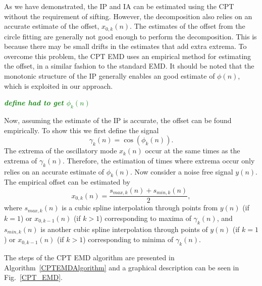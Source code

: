 \documentclass[a4paper]{IEEEtran}
\newcommand{\dean}[1]{\textsf{\emph{\textbf{\textcolor{green}{#1}}}}}
\begin{document}
As we have demonstrated, the IP and IA can be estimated using the CPT without the requirement of sifting. However, the decomposition also relies on an accurate estimate of the offset, $x_{0,k}(n)$. The estimates of the offset from the circle fitting are generally not good enough to perform the decomposition. This is because there may be small drifts in the estimates that add extra extrema. To overcome this problem, the CPT EMD uses an empirical method for estimating the offset, in a similar fashion to the standard EMD. It should be noted that the monotonic structure of the IP generally enables an good estimate of $\phi(n)$, which is exploited in our approach. 

\dean{define had to get $\phi_k(n)$}

Now, assuming the estimate of the IP is accurate, the offset can be found empirically. To show this we first define the signal
\begin{equation}
	\gamma_k(n)=\cos(\phi_k(n)).
\end{equation}   
The extrema of the oscillatory mode $x_k(n)$ occur at the same times as the extrema of $\gamma_k(n)$. Therefore, the estimation of times where extrema occur only relies on an accurate estimate of $\phi_k(n)$. Now consider a noise free signal $y(n)$. The empirical offset can be estimated by 
\begin{equation}
    x_{0,k}(n) = \frac{s_{max,k}(n) + s_{min,k}(n)}{2},
\end{equation}
where $s_{max,k}(n)$ is a cubic spline interpolation through points from $y(n)$ (if $k=1$) or $x_{0,k-1}(n)$ (if $k>1$) corresponding to maxima of $\gamma_k(n)$, and $s_{min,k}(n)$ is another cubic spline interpolation through points of $y(n)$ (if $k=1$) or $x_{0,k-1}(n)$ (if $k>1$) corresponding to minima of $\gamma_k(n)$. 

The steps of the CPT EMD algorithm are presented in Algorithm~\ref{CPTEMDAlgorithm} and a graphical description can be seen in Fig.~\ref{CPT_EMD}.
\end{document}
